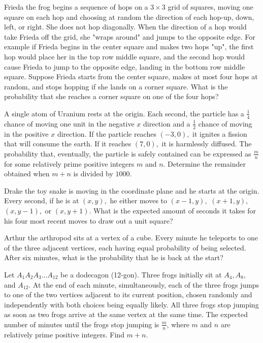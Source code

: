 \documentclass[mast]{lucky}
\begin{document}
\begin{prob}[AMC 10A 2020/23]{4}
Frieda the frog begins a sequence of hops on a $3 \times 3$ grid of squares, moving one square on each hop and choosing at random the direction of each hop-up, down, left, or right. She does not hop diagonally. When the direction of a hop would take Frieda off the grid, she "wraps around" and jumps to the opposite edge. For example if Frieda begins in the center square and makes two hops "up", the first hop would place her in the top row middle square, and the second hop would cause Frieda to jump to the opposite edge, landing in the bottom row middle square. Suppose Frieda starts from the center square, makes at most four hops at random, and stops hopping if she lands on a corner square. What is the probability that she reaches a corner square on one of the four hops?
\end{prob}

\begin{prob}[Mildorf]{4}
 A single atom of Uranium rests at the origin. Each second, the particle has a $\frac{1}{4}$ chance of moving one unit in the negative $x$ direction and a $\frac{1}{2}$ chance of moving in the positive $x$ direction. If the particle reaches $(-3,0),$ it ignites a fission that will consume the earth. If it reaches $(7,0),$ it is harmlessly diffused. The probability that, eventually, the particle is safely contained can be expressed as $\frac{m}{n}$ for some relatively prime positive integers $m$ and $n.$ Determine the remainder obtained when $m+n$ is divided by $1000.$
\end{prob}

\begin{prob}[AVHS 2017]{6}
 Drake the toy snake is moving in the coordinate plane and he starts at the origin. Every second, if he is at $(x,y),$ he either moves to $(x-1,y),$ $(x+1,y),$ $(x,y-1),$ or $(x,y+1).$ What is the expected amount of seconds it takes for his four most recent moves to draw out a unit square?
\end{prob}

\begin{prob}[]{6}
Arthur the arthropod sits at a vertex of a cube.  Every minute he teleports to one of the three adjacent vertices, each having equal probability of being selected.  After six minutes, what is the probability that he is back at the start?
\end{prob}

\begin{prob}[AIME I 2021/12]{6}
Let $A_1A_2A_3...A_{12}$ be a dodecagon (12-gon). Three frogs initially sit at $A_4,A_8,$ and $A_{12}$. At the end of each minute, simultaneously, each of the three frogs jumps to one of the two vertices adjacent to its current position, chosen randomly and independently with both choices being equally likely. All three frogs stop jumping as soon as two frogs arrive at the same vertex at the same time. The expected number of minutes until the frogs stop jumping is $\frac mn$, where $m$ and $n$ are relatively prime positive integers. Find $m+n$.
\end{prob}
\end{document}
